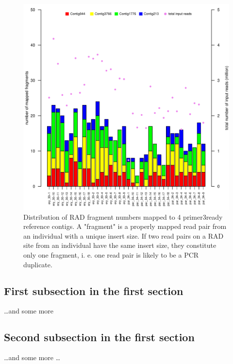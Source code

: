\documentclass[a4paper,12pt,times,print,index, custombib]{PhDThesisPSnPDF}\usepackage[]{graphicx}\usepackage[]{color}
\newenvironment{knitrout}{}{} %
\begin{document}
\begin{figure}
\begin{knitrout}
\color{fgcolor}

{\centering \includegraphics[width=\linewidth]{figure/fragments_mapped_per_ind-1} 

}



\end{knitrout}
\caption{Distribution of RAD fragment numbers mapped to 4 primer3ready reference contigs. 
A "fragment" is a properly mapped read pair from an individual with a unique insert size. 
If two read pairs on a RAD site from an individual have the same insert size, they constitute only one fragment, i. e. one read pair is likely to be a PCR duplicate.}
\label{fragments-mapped-per-ind}
\end{figure}





\subsection{First subsection in the first section}
\dots and some more 

\subsection{Second subsection in the first section}
\dots and some more \dots
\end{document}
